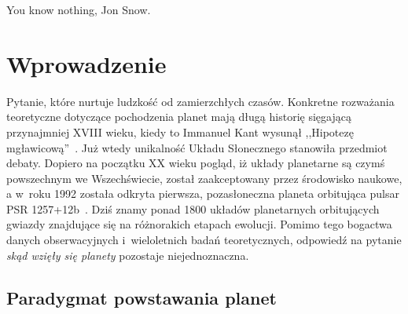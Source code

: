\begin{savequote}[75mm]
   You know nothing, Jon Snow.
\end{savequote}

\chapter{Wprowadzenie}
 Pytanie, które nurtuje ludzkość od
zamierzchłych czasów. Konkretne rozważania teoretyczne dotyczące pochodzenia
planet mają długą historię sięgającą przynajmniej XVIII wieku, kiedy to Immanuel
Kant wysunął ,,Hipotezę mgławicową''~\cite{ImmanuelKant.etal:2008}. Już wtedy
unikalność Układu Słonecznego stanowiła przedmiot debaty. Dopiero na początku XX
wieku pogląd, iż układy planetarne są czymś powszechnym we Wszechświecie, został
zaakceptowany przez środowisko naukowe, a w~roku 1992 została odkryta pierwsza,
pozasłoneczna planeta orbitująca pulsar PSR 1257+12b~\cite{1992Natur.355..145W}.
Dziś znamy ponad 1800 układów planetarnych orbitujących gwiazdy znajdujące się
na różnorakich etapach ewolucji. Pomimo tego bogactwa danych obserwacyjnych
i~wieloletnich badań teoretycznych, odpowiedź na pytanie \emph{skąd wzięły się
planety} pozostaje niejednoznaczna.


\section{Paradygmat powstawania planet}
